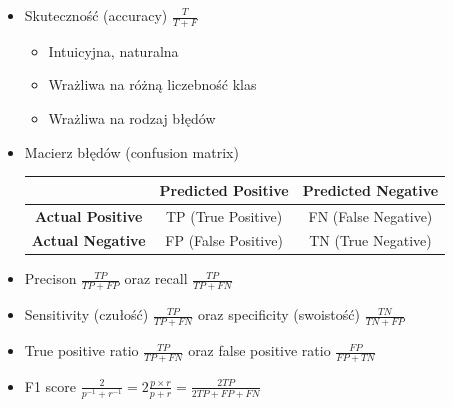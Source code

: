 \documentclass[11pt, xcolor={dvipsnames,svgnames},aspectratio=169]{beamer}
\theoremstyle{plain}
\theoremstyle{plain}
\begin{document}
\begin{frame}
	\begin{itemize}
		\item Skuteczność (accuracy) $\frac{T}{T + F}$\pause
			\begin{itemize}
				\item Intuicyjna, naturalna\pause
				\item Wrażliwa na różną liczebność klas\pause
				\item Wrażliwa na rodzaj błędów\pause
			\end{itemize}
		\item Macierz błędów (confusion matrix)
		\tiny 
    \renewcommand{\arraystretch}{1.5} %
\setlength{\tabcolsep}{10pt}     %
\begin{tabular}{|c|c|c|}
	\hline
	& \textbf{Predicted Positive} & \textbf{Predicted Negative} \\
	\hline
	\textbf{Actual Positive} & TP (True Positive) & FN (False Negative) \\
	\hline
	\textbf{Actual Negative} & FP (False Positive) & TN (True Negative) \\
	\hline
\end{tabular}
\normalsize\pause
	\item Precison $\frac{TP}{TP + FP}$  oraz recall $\frac{TP}{TP + FN}$ \pause
	\item Sensitivity (czułość) $\frac{TP}{TP + FN}$ oraz specificity (swoistość) $\frac{TN}{TN + FP}$\pause
	\item True positive ratio $\frac{TP}{TP + FN}$  oraz false positive ratio $\frac{FP}{FP + TN}$\pause 
	\item F1 score $\frac{2}{p^{-1} + r^{-1}}=2\frac{p \times r}{p + r} = \frac{2TP}{2TP + FP + FN}$

	\end{itemize}
\end{frame}
\end{document}
